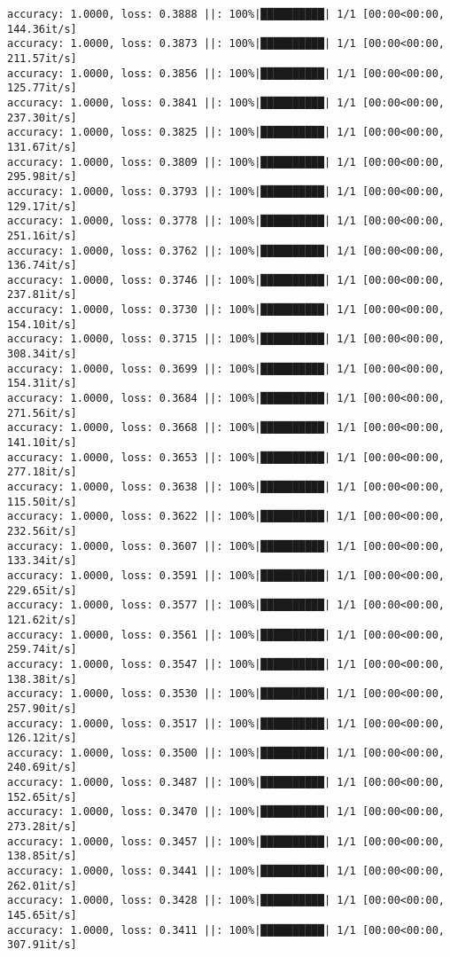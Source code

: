 \documentclass[
]{article}
\begin{document}
\begin{verbatim}
accuracy: 1.0000, loss: 0.3888 ||: 100%|██████████| 1/1 [00:00<00:00, 144.36it/s]
accuracy: 1.0000, loss: 0.3873 ||: 100%|██████████| 1/1 [00:00<00:00, 211.57it/s]
accuracy: 1.0000, loss: 0.3856 ||: 100%|██████████| 1/1 [00:00<00:00, 125.77it/s]
accuracy: 1.0000, loss: 0.3841 ||: 100%|██████████| 1/1 [00:00<00:00, 237.30it/s]
accuracy: 1.0000, loss: 0.3825 ||: 100%|██████████| 1/1 [00:00<00:00, 131.67it/s]
accuracy: 1.0000, loss: 0.3809 ||: 100%|██████████| 1/1 [00:00<00:00, 295.98it/s]
accuracy: 1.0000, loss: 0.3793 ||: 100%|██████████| 1/1 [00:00<00:00, 129.17it/s]
accuracy: 1.0000, loss: 0.3778 ||: 100%|██████████| 1/1 [00:00<00:00, 251.16it/s]
accuracy: 1.0000, loss: 0.3762 ||: 100%|██████████| 1/1 [00:00<00:00, 136.74it/s]
accuracy: 1.0000, loss: 0.3746 ||: 100%|██████████| 1/1 [00:00<00:00, 237.81it/s]
accuracy: 1.0000, loss: 0.3730 ||: 100%|██████████| 1/1 [00:00<00:00, 154.10it/s]
accuracy: 1.0000, loss: 0.3715 ||: 100%|██████████| 1/1 [00:00<00:00, 308.34it/s]
accuracy: 1.0000, loss: 0.3699 ||: 100%|██████████| 1/1 [00:00<00:00, 154.31it/s]
accuracy: 1.0000, loss: 0.3684 ||: 100%|██████████| 1/1 [00:00<00:00, 271.56it/s]
accuracy: 1.0000, loss: 0.3668 ||: 100%|██████████| 1/1 [00:00<00:00, 141.10it/s]
accuracy: 1.0000, loss: 0.3653 ||: 100%|██████████| 1/1 [00:00<00:00, 277.18it/s]
accuracy: 1.0000, loss: 0.3638 ||: 100%|██████████| 1/1 [00:00<00:00, 115.50it/s]
accuracy: 1.0000, loss: 0.3622 ||: 100%|██████████| 1/1 [00:00<00:00, 232.56it/s]
accuracy: 1.0000, loss: 0.3607 ||: 100%|██████████| 1/1 [00:00<00:00, 133.34it/s]
accuracy: 1.0000, loss: 0.3591 ||: 100%|██████████| 1/1 [00:00<00:00, 229.65it/s]
accuracy: 1.0000, loss: 0.3577 ||: 100%|██████████| 1/1 [00:00<00:00, 121.62it/s]
accuracy: 1.0000, loss: 0.3561 ||: 100%|██████████| 1/1 [00:00<00:00, 259.74it/s]
accuracy: 1.0000, loss: 0.3547 ||: 100%|██████████| 1/1 [00:00<00:00, 138.38it/s]
accuracy: 1.0000, loss: 0.3530 ||: 100%|██████████| 1/1 [00:00<00:00, 257.90it/s]
accuracy: 1.0000, loss: 0.3517 ||: 100%|██████████| 1/1 [00:00<00:00, 126.12it/s]
accuracy: 1.0000, loss: 0.3500 ||: 100%|██████████| 1/1 [00:00<00:00, 240.69it/s]
accuracy: 1.0000, loss: 0.3487 ||: 100%|██████████| 1/1 [00:00<00:00, 152.65it/s]
accuracy: 1.0000, loss: 0.3470 ||: 100%|██████████| 1/1 [00:00<00:00, 273.28it/s]
accuracy: 1.0000, loss: 0.3457 ||: 100%|██████████| 1/1 [00:00<00:00, 138.85it/s]
accuracy: 1.0000, loss: 0.3441 ||: 100%|██████████| 1/1 [00:00<00:00, 262.01it/s]
accuracy: 1.0000, loss: 0.3428 ||: 100%|██████████| 1/1 [00:00<00:00, 145.65it/s]
accuracy: 1.0000, loss: 0.3411 ||: 100%|██████████| 1/1 [00:00<00:00, 307.91it/s]

\end{verbatim}
\end{document}
